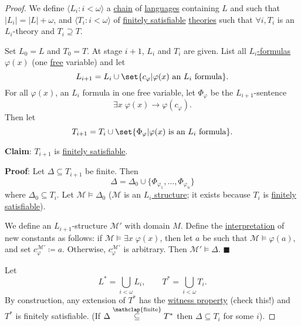 \documentclass{article}
\let\models\vDash
\begin{document}
\begin{proof}
  We define $\langle L_i : i < \omega \rangle$ a \hyperlink{def:chain}{chain} of \hyperlink{def:lang}{languages} containing $L$ and such that $|L_i| = |L| + \omega$, and $\langle T_i : i < \omega \rangle$ of \hyperlink{def:fs}{finitely satisfiable} \hyperlink{def:ltheory}{theories} such that $\forall i, T_i$ is an $L_i$-theory and $T_i \supseteq T$.

  Set $L_0 = L$ and $T_0 = T$. At stage $i+1$, $L_i$ and $T_i$ are given.
  List all \hyperlink{def:form}{$L_i$-formulas} $\varphi(x)$ (one \hyperlink{def:free}{free} variable) and let
  \begin{equation*}L_{i+1} = L_i \cup \set{c_\varphi | \varphi(x) \text{ an } L_i \text{ formula}}.\end{equation*}
  For all $\varphi(x)$, an $L_i$ formula in one free variable, let $\Phi_\varphi$ be the $L_{i+1}$-sentence
  \begin{equation*}
    \exists x \; \varphi(x) \to \varphi(c_\varphi).
  \end{equation*}
  Then let
  \begin{equation*}T_{i+1} = T_i \cup \set{\Phi_\varphi | \varphi(x)\text{ is an }L_i\text{ formula}}.\end{equation*}

  \textbf{Claim}: $T_{i+1}$ is \hyperlink{def:fs}{finitely satisfiable}.

  \textbf{Proof}: Let $\Delta \subseteq T_{i+1}$ be finite.
  Then
  \begin{equation*}\Delta = \Delta_0 \cup \{\Phi_{\varphi_1}, \dotsc, \Phi_{\varphi_n}\}\end{equation*}
  where $\Delta_0 \subseteq T_i$.
  Let $\mathcal{M} \models \Delta_0$ ($\mathcal{M}$ is an \hyperlink{def:str}{$L_i$ structure}; it exists because $T_i$ is \hyperlink{def:fs}{finitely satisfiable}).

  We define an $L_{i+1}$-structure $\mathcal{M}'$ with domain $M$.
  Define the \hyperlink{def:str}{interpretation} of new constants as follows:
  if $\mathcal{M} \models \exists x \; \varphi(x)$, then let $a$ be such that $\mathcal{M} \models \varphi(a)$, and set $c_\varphi^{\mathcal{M}'} \coloneqq a$.
  Otherwise, $c_\varphi^{\mathcal{M}'}$ is arbitrary. Then $\mathcal{M}' \models \Delta$. $\blacksquare$

  Let
  \begin{equation*}L^* = \bigcup_{i < \omega} L_i, \qquad T^* = \bigcup_{i < \omega} T_i.\end{equation*}
  By construction, any extension of $T^*$ has the \hyperlink{def:wp}{witness property} (check this!) and $T^*$ is finitely satisfiable.
  (If $\Delta \overset{\mathclap{\text{finite}}}\subseteq T^*$ then $\Delta \subseteq T_i$ for some $i$).
\end{proof}
\end{document}
